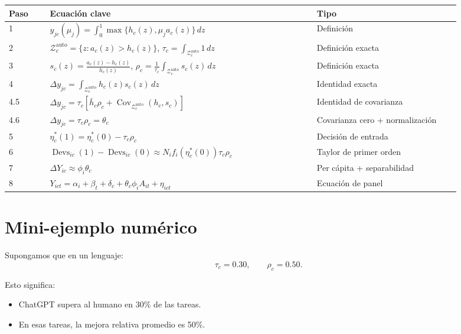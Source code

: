 \documentclass[11pt,a4paper]{article}
\newcommand{\Zauto}{\mathcal{Z}^{\mathrm{auto}}_c}
\newcommand{\Covauto}{\operatorname{Cov}_{\Zauto}}
\newcommand{\Devs}{\operatorname{Devs}}
\newcommand{\dd}{\,dz}
\begin{document}
\begin{center}
\begin{tabular}{p{0.08\linewidth}p{0.52\linewidth}p{0.29\linewidth}}
\toprule
Paso & Ecuación clave & Tipo \\
\midrule
1 &
\(\displaystyle y_{jc}(\mu_j)=\int_0^1\max\{h_c(z),\mu_j a_c(z)\}\dd\) &
Definición \\
2 &
\(\displaystyle \Zauto=\{z:a_c(z)>h_c(z)\}\), \(\displaystyle \tau_c=\int_{\Zauto}1\dd\) &
Definición exacta \\
3 &
\(\displaystyle s_c(z)=\frac{a_c(z)-h_c(z)}{h_c(z)}\), \(\displaystyle \rho_c=\frac{1}{\tau_c}\int_{\Zauto}s_c(z)\dd\) &
Definición exacta \\
4 &
\(\displaystyle \Delta y_{jc}=\int_{\Zauto}h_c(z)s_c(z)\dd\) &
Identidad exacta \\
4.5 &
\(\displaystyle \Delta y_{jc}=\tau_c[\bar h_c\rho_c+\Covauto(h_c,s_c)]\) &
Identidad de covarianza \\
4.6 &
\(\displaystyle \Delta y_{jc}=\tau_c\rho_c=\theta_c\) &
Covarianza cero + normalización \\
5 &
\(\displaystyle \eta_c^*(1)=\eta_c^*(0)-\tau_c\rho_c\) &
Decisión de entrada \\
6 &
\(\displaystyle \Devs_{ic}(1)-\Devs_{ic}(0)\approx N_i f_i(\eta_c^*(0))\tau_c\rho_c\) &
Taylor de primer orden \\
7 &
\(\displaystyle \Delta Y_{ic}\approx \phi_i\theta_c\) &
Per cápita + separabilidad \\
8 &
\(\displaystyle Y_{ict}=\alpha_i+\beta_t+\delta_c+\theta_c\phi_i A_{it}+\eta_{ict}\) &
Ecuación de panel \\
\bottomrule
\end{tabular}
\end{center}

\section{Mini-ejemplo numérico}

Supongamos que en un lenguaje:
\[
\tau_c=0.30,\qquad \rho_c=0.50.
\]

Esto significa:

\begin{itemize}
  \item ChatGPT supera al humano en 30\% de las tareas.
  \item En esas tareas, la mejora relativa promedio es 50\%.
\end{itemize}
\end{document}
